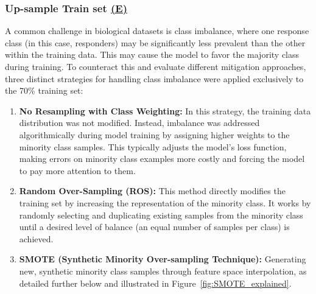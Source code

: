 \documentclass[12pt,a4paper]{report}
\begin{document}
\subsubsection*{Up-sample Train set \hyperref[fig:pipeline-1]{(E)}}
\label{subsubsec:up-sample_train_set}
A common challenge in biological datasets is class imbalance, where one response class (in this case, responders) may be significantly less prevalent than the other within the training data. This may cause the model to favor the majority class during training. To counteract this and evaluate different mitigation approaches, three distinct strategies for handling class imbalance were applied exclusively to the 70\% training set:

\begin{enumerate}
    \item \textbf{No Resampling with Class Weighting:} In this strategy, the training data distribution was not modified. Instead, imbalance was addressed algorithmically during model training by assigning higher weights to the minority class samples. This typically adjusts the model's loss function, making errors on minority class examples more costly and forcing the model to pay more attention to them.
    \item \textbf{Random Over-Sampling (ROS):} This method directly modifies the training set by increasing the representation of the minority class. It works by randomly selecting and duplicating existing samples from the minority class until a desired level of balance (an equal number of samples per class) is achieved.
    \item \textbf{SMOTE (Synthetic Minority Over-sampling Technique):} Generating new, synthetic minority class samples through feature space interpolation, as detailed further below and illustrated in Figure~\ref{fig:SMOTE_explained}.
\end{enumerate}
\end{document}
